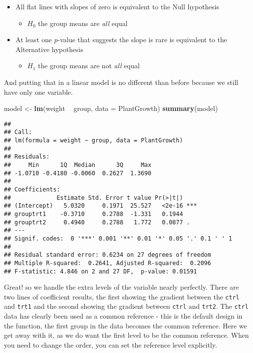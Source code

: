 \documentclass[]{book}
\newenvironment{Shaded}{\begin{snugshade}}{\end{snugshade}}
\newcommand{\DataTypeTok}[1]{\textcolor[rgb]{0.13,0.29,0.53}{#1}}
\newcommand{\KeywordTok}[1]{\textcolor[rgb]{0.13,0.29,0.53}{\textbf{#1}}}
\newcommand{\NormalTok}[1]{#1}
\newcommand{\OperatorTok}[1]{\textcolor[rgb]{0.81,0.36,0.00}{\textbf{#1}}}
\newcommand{\StringTok}[1]{\textcolor[rgb]{0.31,0.60,0.02}{#1}}
\providecommand{\tightlist}{%
  \setlength{\itemsep}{0pt}\setlength{\parskip}{0pt}}
\begin{document}
\begin{itemize}
\tightlist
\item
  All flat lines with slopes of zero is equivalent to the Null hypothesis

  \begin{itemize}
  \tightlist
  \item
    \(H_{0}\) the group means are \emph{all} equal
  \end{itemize}
\item
  At least one \(p\)-value that suggests the slope is rare is equivalent to the Alternative hypothesis

  \begin{itemize}
  \tightlist
  \item
    \(H_{1}\) the group means are not \emph{all} equal
  \end{itemize}
\end{itemize}

And putting that in a linear model is no different than before because we still have only one variable.

\begin{Shaded}
\begin{Highlighting}[]
\NormalTok{model <-}\StringTok{ }\KeywordTok{lm}\NormalTok{(weight }\OperatorTok{~}\StringTok{ }\NormalTok{group, }\DataTypeTok{data =}\NormalTok{ PlantGrowth)}
\KeywordTok{summary}\NormalTok{(model)}
\end{Highlighting}
\end{Shaded}

\begin{verbatim}
## 
## Call:
## lm(formula = weight ~ group, data = PlantGrowth)
## 
## Residuals:
##     Min      1Q  Median      3Q     Max 
## -1.0710 -0.4180 -0.0060  0.2627  1.3690 
## 
## Coefficients:
##             Estimate Std. Error t value Pr(>|t|)    
## (Intercept)   5.0320     0.1971  25.527   <2e-16 ***
## grouptrt1    -0.3710     0.2788  -1.331   0.1944    
## grouptrt2     0.4940     0.2788   1.772   0.0877 .  
## ---
## Signif. codes:  0 '***' 0.001 '**' 0.01 '*' 0.05 '.' 0.1 ' ' 1
## 
## Residual standard error: 0.6234 on 27 degrees of freedom
## Multiple R-squared:  0.2641, Adjusted R-squared:  0.2096 
## F-statistic: 4.846 on 2 and 27 DF,  p-value: 0.01591
\end{verbatim}

Great! so we handle the extra levels of the variable nearly perfectly. There are two lines of coefficient results, the first showing the gradient between the \texttt{ctrl} and \texttt{trt1} and the second showing the gradient between \texttt{ctrl} and \texttt{trt2}. The \texttt{ctrl} data has clearly been used as a common reference - this is the default design in the function, the first group in the data becomes the common reference. Here we get away with it, as we do want the first level to be the common reference. When you need to change the order, you can set the reference level explicitly.
\end{document}
